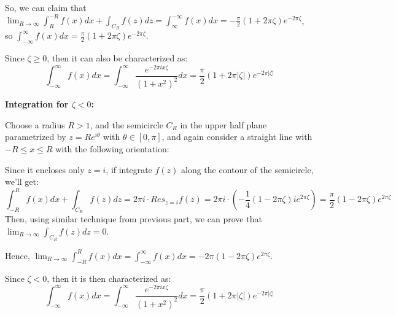 \documentclass{article}
\begin{document}
So, we can claim that $\lim_{R\rightarrow\infty}\int_{R}^{-R}f(x)dx + \int_{C_R}f(z)dz = \int_{\infty}^{-\infty}f(x)dx = -\frac{\pi}{2}(1+2\pi\zeta)e^{-2\pi\zeta}$, so $\int_{-\infty}^{\infty}f(x)dx = \frac{\pi}{2}(1+2\pi\zeta)e^{-2\pi\zeta}$.

Since $\zeta\geq 0$, then it can also be characterized as:
$$\int_{-\infty}^{\infty}f(x)dx = \int_{-\infty}^{\infty}\frac{e^{-2\pi ix\zeta}}{(1+x^2)^2}dx = \frac{\pi}{2}(1+2\pi|\zeta|)e^{-2\pi|\zeta|}$$

\hfil

\textbf{Integration for $\zeta<0$:}

Choose a radius $R>1$, and the semicircle $C_R$ in the upper half plane parametrized by $z=Re^{i\theta}$ with $\theta\in [0,\pi]$, and again consider a straight line with $-R\leq x\leq R$ with the following orientation:

\begin{center}
\end{center}

Since it encloses only $z=i$, if integrate $f(z)$ along the contour of the semicircle, we'll get:
$$\int_{-R}^{R}f(x)dx+\int_{C_R}f(z)dz = 2\pi i\cdot Res_{z=i}f(z)=2\pi i\cdot (-\frac{1}{4}(1-2\pi \zeta)ie^{2\pi \zeta}) = \frac{\pi}{2}(1-2\pi\zeta)e^{2\pi\zeta}$$
Then, using similar technique from previous part, we can prove that $\lim_{R\rightarrow\infty}\int_{C_R}f(z)dz = 0$.

Hence, $\lim_{R\rightarrow\infty}\int_{-R}^{R}f(x)dx = \int_{-\infty}^{\infty}f(x)dx = -2\pi(1-2\pi\zeta)e^{2\pi\zeta}$.

Since $\zeta<0$, then it is then characterized as:
$$\int_{-\infty}^{\infty}f(x)dx =\int_{-\infty}^{\infty}\frac{e^{-2\pi ix\zeta}}{(1+x^2)^2}dx = \frac{\pi}{2}(1+2\pi|\zeta|)e^{-2\pi|\zeta|}$$
\end{document}

